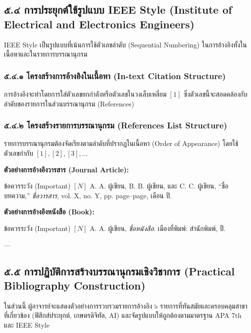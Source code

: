 \documentclass[11pt,a4paper,openany]{report}
\begin{document}
\subsection{๕.๔ การประยุกต์ใช้รูปแบบ IEEE Style (Institute of Electrical and Electronics Engineers)}


IEEE Style เป็นรูปแบบที่เน้นการใช้ตัวเลขลำดับ (Sequential Numbering) ในการอ้างอิงทั้งในเนื้อหาและในรายการบรรณานุกรม

\subsubsection{๕.๔.๑ โครงสร้างการอ้างอิงในเนื้อหา (In-text Citation Structure)}


การอ้างอิงจะทำโดยการใส่ตัวเลขยกกำลังหรือตัวเลขในวงเล็บเหลี่ยม $[1]$ ซึ่งตัวเลขนี้จะสอดคล้องกับลำดับของรายการในส่วนบรรณานุกรม (References)

\subsubsection{๕.๔.๒ โครงสร้างรายการบรรณานุกรม (References List Structure)}


รายการบรรณานุกรมต้องจัดเรียงตามลำดับที่ปรากฏในเนื้อหา (Order of Appearance) โดยใช้ตัวเลขกำกับ $[1], [2], [3], \dots$

\textbf{ตัวอย่างการอ้างอิงวารสาร (Journal Article):}
\begin{importantbox}{ข้อควรระวัง (Important)}
$[N]$ A. A. ผู้เขียน, B. B. ผู้เขียน, และ C. C. ผู้เขียน, “ชื่อบทความ,” \textit{ชื่อวารสาร}, vol. X, no. Y, pp. page–page, เดือน ปี. \\
\end{importantbox}


\textbf{ตัวอย่างการอ้างอิงหนังสือ (Book):}
\begin{importantbox}{ข้อควรระวัง (Important)}
$[N]$ A. A. ผู้เขียน, \textit{ชื่อหนังสือ}. เมืองที่พิมพ์: สำนักพิมพ์, ปี. \\
\end{importantbox}


---

\subsection{๕.๕ การปฏิบัติการสร้างบรรณานุกรมเชิงวิชาการ (Practical Bibliography Construction)}


ในส่วนนี้ ผู้อาจารย์จะแสดงตัวอย่างการรวบรวมรายการอ้างอิง ๖ รายการที่ทันสมัยและครอบคลุมสาขาที่เกี่ยวข้อง (ฟิสิกส์ประยุกต์, เกษตรดิจิทัล, AI) และจัดรูปแบบให้ถูกต้องตามมาตรฐาน APA 7th และ IEEE Style
\end{document}
